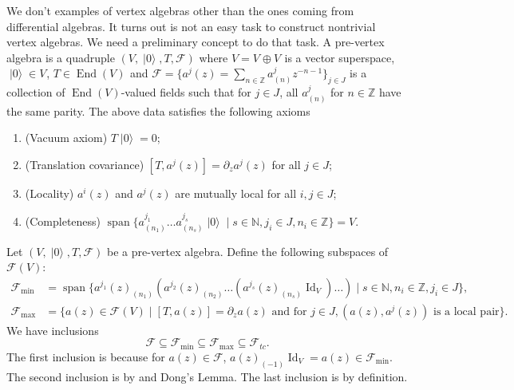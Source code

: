 \documentclass[a4paper, 12pt, reqno]{amsart}
\theoremstyle{remark}
\numberwithin{equation}{subsection}
\DeclareMathOperator{\Id}{Id}
\DeclareMathOperator{\End}{End}
\DeclareMathOperator{\vspan}{span}
\DeclareMathOperator{\vac}{|0\rangle}
\DeclareMathOperator{\zero}{\overline{0}}
\DeclareMathOperator{\one}{\overline{1}}
\begin{document}
We don't examples of vertex algebras other than the ones coming from differential algebras.
It turns out is not an easy task to construct nontrivial vertex algebras.
We need a preliminary concept to do that task. 
A pre-vertex algebra is a quadruple $(V, \vac, T, \mathcal{F})$ where $V = V_{\zero} \oplus V_{\one}$ is a vector superspace, $\vac \in V_{\zero}$, $T \in \End(V)_{\zero}$ and $\mathcal{F} = \{a^j(z) = \sum_{n \in \mathbb{Z}}a^j_{(n)}z^{-n - 1}\}_{j \in J}$ is a collection of $\End(V)$-valued fields such that for $j \in J$, all $a^j_{(n)}$ for $n \in \mathbb{Z}$ have the same parity.
The above data satisfies the following axioms
\begin{enumerate}
\item (Vacuum axiom) $T\vac = 0$;
\item (Translation covariance) $[T, a^j(z)] = \partial_za^j(z)$ for all $j \in J$;
\item (Locality) $a^i(z)$ and $a^j(z)$ are mutually local for all $i, j \in J$;
\item (Completeness) $\vspan\{a^{j_1}_{(n_1)}\dots a^{j_s}_{(n_s)}\vac \mid s \in \mathbb{N}, j_i \in J, n_i \in \mathbb{Z}\} = V$.
\end{enumerate}

Let $(V, \vac, T, \mathcal{F})$ be a pre-vertex algebra.
Define the following subspaces of $\mathcal{F}(V)$:
\begin{align*}
  \mathcal{F}_{\min} &= \vspan\{a^{j_1}(z)_{(n_1)}(a^{j_2}(z)_{(n_2)}\dots(a^{j_s}(z)_{(n_s)}\Id_V)\dots) \mid s \in \mathbb{N}, n_i \in \mathbb{Z}, j_i \in J\}, \\
  \mathcal{F}_{\max} &= \{a(z) \in \mathcal{F}(V) \mid [T, a(z)] = \partial_za(z)\text{ and for }j \in J, (a(z),a^j(z))\text{ is a local pair}\}.
\end{align*}
We have inclusions
\begin{equation*}
  \mathcal{F} \subseteq \mathcal{F}_{\min} \subseteq \mathcal{F}_{\max} \subseteq \mathcal{F}_{tc}.
\end{equation*}
The first inclusion is because for $a(z) \in \mathcal{F}$, $a(z)_{(-1)}\Id_V = a(z) \in \mathcal{F}_{\min}$.
The second inclusion is by  and Dong's Lemma.
The last inclusion is by definition.
\end{document}

